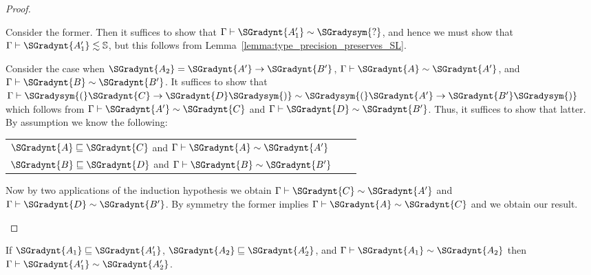 \begin{proof}
\begin{itemize}
    Consider the former.  Then it suffices to show that $ \Gamma  \vdash  \SGradynt{A'_{{\mathrm{1}}}}  \sim  \SGradysym{\mbox{?}} $,
    and hence we must show that $ \Gamma  \vdash  \SGradynt{A'_{{\mathrm{1}}}}  \lesssim   \mathbb{S}  $, but this follows
    from Lemma~\ref{lemma:type_precision_preserves_SL}.

    Consider the case when $\SGradynt{A_{{\mathrm{2}}}} = \SGradynt{A'}  \rightarrow  \SGradynt{B'}$, $ \Gamma  \vdash  \SGradynt{A}  \sim  \SGradynt{A'} $, and $ \Gamma  \vdash  \SGradynt{B}  \sim  \SGradynt{B'} $.
    It suffices to show that $ \Gamma  \vdash  \SGradysym{(}  \SGradynt{C}  \rightarrow  \SGradynt{D}  \SGradysym{)}  \sim  \SGradysym{(}  \SGradynt{A'}  \rightarrow  \SGradynt{B'}  \SGradysym{)} $ which follows from
    $ \Gamma  \vdash  \SGradynt{A'}  \sim  \SGradynt{C} $ and $ \Gamma  \vdash  \SGradynt{D}  \sim  \SGradynt{B'} $.  Thus, it suffices to show that latter.
    By assumption we know the following:
    \begin{center}
      \begin{tabular}{lll}
        $ \SGradynt{A}  \sqsubseteq  \SGradynt{C} $ and $ \Gamma  \vdash  \SGradynt{A}  \sim  \SGradynt{A'} $\\
        $ \SGradynt{B}  \sqsubseteq  \SGradynt{D} $ and $ \Gamma  \vdash  \SGradynt{B}  \sim  \SGradynt{B'} $
      \end{tabular}
    \end{center}
    Now by two applications of the induction hypothesis we obtain $ \Gamma  \vdash  \SGradynt{C}  \sim  \SGradynt{A'} $
    and $ \Gamma  \vdash  \SGradynt{D}  \sim  \SGradynt{B'} $. By symmetry the former implies $ \Gamma  \vdash  \SGradynt{A}  \sim  \SGradynt{C} $ and
    we obtain our result.
  \end{itemize}  
\end{proof}

\begin{corollary}
  \label{corollary:congruence_of_type_consistency_along_type_precision}
  If $ \SGradynt{A_{{\mathrm{1}}}}  \sqsubseteq  \SGradynt{A'_{{\mathrm{1}}}} $, $ \SGradynt{A_{{\mathrm{2}}}}  \sqsubseteq  \SGradynt{A'_{{\mathrm{2}}}} $, and $ \Gamma  \vdash  \SGradynt{A_{{\mathrm{1}}}}  \sim  \SGradynt{A_{{\mathrm{2}}}} $ then
  $ \Gamma  \vdash  \SGradynt{A'_{{\mathrm{1}}}}  \sim  \SGradynt{A'_{{\mathrm{2}}}} $.  
\end{corollary}

